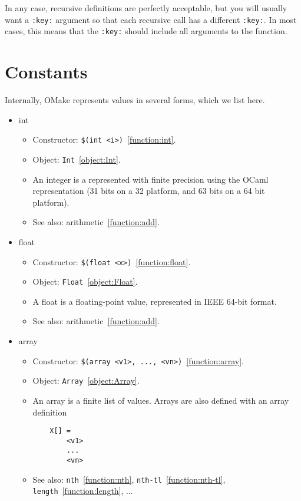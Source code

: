 In any case, recursive definitions are perfectly acceptable, but you will usually want a
\verb+:key:+ argument so that each recursive call has a different \verb+:key:+.  In most cases, this
means that the \verb+:key:+ should include all arguments to the function.

\section{Constants}

Internally, OMake represents values in several forms, which we list here.

\begin{itemize}
\item int

\begin{itemize}
\item Constructor: \verb+$(int <i>)+~\ref{function:int}.
\item Object: \verb+Int+~\ref{object:Int}.
\item An integer is a represented with finite precision using the OCaml representation (31 bits on a
  32 platform, and 63 bits on a 64 bit platform).
\item See also: arithmetic~\ref{function:add}.
\end{itemize}

\item float

\begin{itemize}
\item Constructor: \verb+$(float <x>)+~\ref{function:float}.
\item Object: \verb+Float+~\ref{object:Float}.
\item A float is a floating-point value, represented in IEEE 64-bit format.
\item See also: arithmetic~\ref{function:add}.
\end{itemize}

\item array

\begin{itemize}
\item Constructor: \verb+$(array <v1>, ..., <vn>)+~\ref{function:array}.
\item Object: \verb+Array+~\ref{object:Array}.
\item An array is a finite list of values.
  Arrays are also defined with an array definition
\begin{verbatim}
    X[] =
        <v1>
        ...
        <vn>
\end{verbatim}
\item See also: \verb+nth+~\ref{function:nth}, \verb+nth-tl+~\ref{function:nth-tl},
  \verb+length+~\ref{function:length}, $\ldots$
\end{itemize}


\end{itemize}
